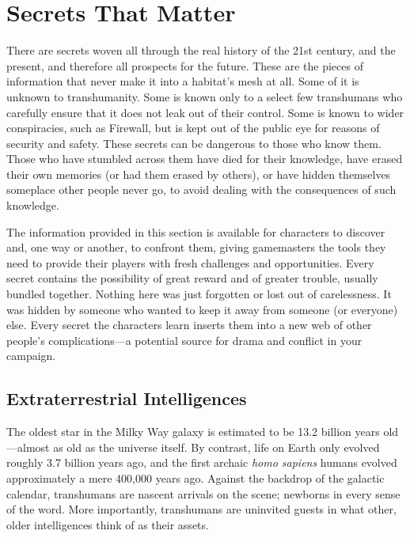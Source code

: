 \section{Secrets That Matter}

There are secrets woven all through the real history of 
the 21st century, and the present, and therefore all prospects
for the future. These are the pieces of information
that never make it into a habitat's mesh at all. Some of 
it is unknown to transhumanity. Some is known only 
to a select few transhumans who carefully ensure that 
it does not leak out of their control. Some is known to 
wider conspiracies, such as Firewall, but is kept out of 
the public eye for reasons of security and safety. These 
secrets can be dangerous to those who know them. 
Those who have stumbled across them have died for 
their knowledge, have erased their own memories (or 
had them erased by others), or have hidden themselves 
someplace other people never go, to avoid dealing with 
the consequences of such knowledge.

The information provided in this section is available 
for characters to discover and, one way or another, 
to confront them, giving gamemasters the tools they 
need to provide their players with fresh challenges and 
opportunities. Every secret contains the possibility of 
great reward and of greater trouble, usually bundled 
together. Nothing here was just forgotten or lost out 
of carelessness. It was hidden by someone who wanted 
to keep it away from someone (or everyone) else. 
Every secret the characters learn inserts them into a 
new web of other people's complications—a potential 
source for drama and conflict in your campaign.

\subsection{Extraterrestrial Intelligences}

The oldest star in the Milky Way galaxy is estimated 
to be 13.2 billion years old—almost as old as the 
universe itself. By contrast, life on Earth only evolved 
roughly 3.7 billion years ago, and the first  archaic 
\textit{homo sapiens} humans evolved approximately a mere 
400,000 years ago. Against the backdrop of the galactic
calendar, transhumans are nascent arrivals on
the scene; newborns in every sense of the word. More 
importantly, transhumans are uninvited guests in what 
other, older intelligences think of as their assets.

